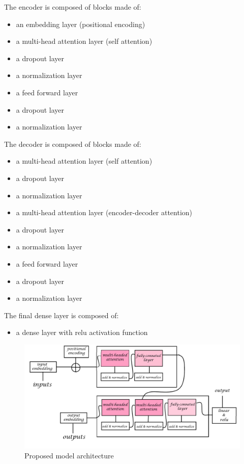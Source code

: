 \documentclass[a4paper]{sapthesis}
\begin{document}
  The encoder is composed of blocks made of:
  \begin{itemize}
  \item an embedding layer (positional encoding)
  \item a multi-head attention layer (self attention)
  \item a dropout layer
  \item a normalization layer
  \item a feed forward layer
  \item a dropout layer
  \item a normalization layer
  \end{itemize}
  
  The decoder is composed of blocks made of:
  \begin{itemize}
  \item a multi-head attention layer (self attention)
  \item a dropout layer
  \item a normalization layer
  \item a multi-head attention layer (encoder-decoder attention)
  \item a dropout layer
  \item a normalization layer
  \item a feed forward layer
  \item a dropout layer
  \item a normalization layer
  \end{itemize}
  
  The final dense layer is composed of:
  \begin{itemize}
  \item a dense layer with relu activation function
  \end{itemize}

  \begin{figure}[h!]
    \centering
    \includegraphics[width=1\linewidth]{images/positional_transformer_model.png}
    \caption{Proposed model architecture}
    \end{figure}
  
\end{document}
